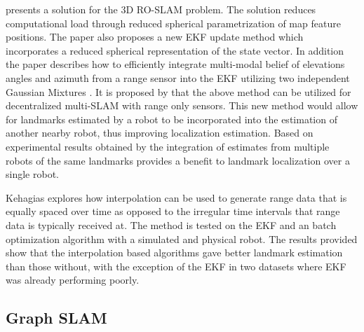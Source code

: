 \documentclass[conference]{IEEEtran}
\begin{document}
\cite{Fabresse2013} presents a solution for the 3D RO-SLAM problem. The solution reduces computational load through reduced spherical parametrization of map feature positions. The paper also proposes a new EKF update method which incorporates a reduced spherical representation of the state vector. In addition the paper describes how to efficiently integrate multi-modal belief of elevations angles and azimuth from a range sensor into the EKF utilizing two independent Gaussian Mixtures \cite{Fabresse2013}. It is proposed by \cite{Fabresse2015} that the above method can be utilized for decentralized multi-SLAM with range only sensors. This new method would allow for landmarks estimated by a robot to be incorporated into the estimation of another nearby robot, thus improving localization estimation. Based on experimental results obtained by \cite{Fabresse2015} the integration of estimates from multiple robots of the same landmarks provides a benefit to landmark localization over a single robot.

Kehagias explores how interpolation can be used to generate range data that is equally spaced over time as opposed to the irregular time intervals that range data is typically received at. \cite{Kehagias2006} The method is tested on the EKF and an batch optimization algorithm with a simulated and physical robot. The results provided show that the interpolation based algorithms gave better landmark estimation than those without, with the exception of the EKF in two datasets where EKF was already performing poorly.









\subsection{Graph SLAM}
\end{document}
